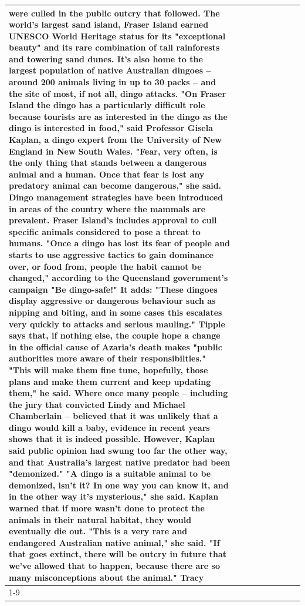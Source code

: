 \begin{table}[H]
\begin{tabular}{lllrlllll}
were culled in the public outcry that followed. The world's largest sand island, Fraser Island earned UNESCO World Heritage status for its "exceptional beauty" and its rare combination of tall rainforests and towering sand dunes. It's also home to the largest population of native Australian dingoes -- around 200 animals living in up to 30 packs -- and the site of most, if not all, dingo attacks. "On Fraser Island the dingo has a particularly difficult role because tourists are as interested in the dingo as the dingo is interested in food," said Professor Gisela Kaplan, a dingo expert from the University of New England in New South Wales. "Fear, very often, is the only thing that stands between a dangerous animal and a human. Once that fear is lost any predatory animal can become dangerous," she said. Dingo management strategies have been introduced in areas of the country where the mammals are prevalent. Fraser Island's includes approval to cull specific animals considered to pose a threat to humans. "Once a dingo has lost its fear of people and starts to use aggressive tactics to gain dominance over, or food from, people the habit cannot be changed," according to the Queensland government's campaign "Be dingo-safe!" It adds: "These dingoes display aggressive or dangerous behaviour such as nipping and biting, and in some cases this escalates very quickly to attacks and serious mauling." Tipple says that, if nothing else, the couple hope a change in the official cause of Azaria's death makes "public authorities more aware of their responsibilties." "This will make them fine tune, hopefully, those plans and make them current and keep updating them," he said. Where once many people -- including the jury that convicted Lindy and Michael Chamberlain -- believed that it was unlikely that a dingo would kill a baby, evidence in recent years shows that it is indeed possible. However, Kaplan said public opinion had swung too far the other way, and that Australia's largest native predator had been "demonized." "A dingo is a suitable animal to be demonized, isn't it? In one way you can know it, and in the other way it's mysterious," she said. Kaplan warned that if more wasn't done to protect the animals in their natural habitat, they would eventually die out. "This is a very rare and endangered Australian native animal," she said. "If that goes extinct, there will be outcry in future that we've allowed that to happen, because there are so many misconceptions about the animal." Tracy \\
\cline{1-9}

\end{tabular}
\end{table}
